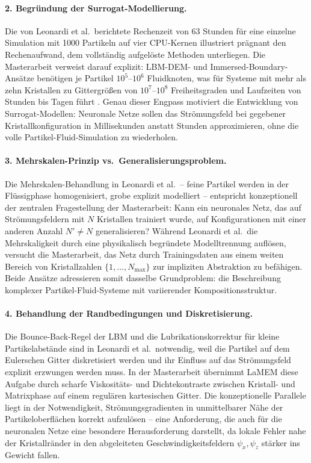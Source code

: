 \documentclass[a4paper,12pt]{article}
\begin{document}
\paragraph{2. Begründung der Surrogat-Modellierung.}
Die von Leonardi et al.\ berichtete Rechenzeit von 63 Stunden für eine
einzelne Simulation mit 1000 Partikeln auf vier CPU-Kernen illustriert
prägnant den Rechenaufwand, dem vollständig aufgelöste Methoden
unterliegen. Die Masterarbeit verweist darauf explizit: LBM-DEM- und
Immersed-Boundary-Ansätze benötigen je Partikel $10^5$--$10^6$ Fluidknoten,
was für Systeme mit mehr als zehn Kristallen zu Gittergrößen von $10^7$--$10^8$
Freiheitsgraden und Laufzeiten von Stunden bis Tagen führt
\cite{leonardi_coupled_2014}. Genau dieser Engpass motiviert die Entwicklung
von Surrogat-Modellen: Neuronale Netze sollen das Strömungsfeld bei
gegebener Kristallkonfiguration in Millisekunden anstatt Stunden
approximieren, ohne die volle Partikel-Fluid-Simulation zu wiederholen.

\paragraph{3. Mehrskalen-Prinzip vs.\ Generalisierungsproblem.}
Die Mehrskalen-Behandlung in Leonardi et al.\ -- feine Partikel werden in
der Flüssigphase homogenisiert, grobe explizit modelliert -- entspricht
konzeptionell der zentralen Fragestellung der Masterarbeit: Kann ein neuronales
Netz, das auf Strömungsfeldern mit $N$ Kristallen trainiert wurde, auf
Konfigurationen mit einer anderen Anzahl $N' \neq N$ generalisieren? Während
Leonardi et al.\ die Mehrskaligkeit durch eine physikalisch begründete
Modelltrennung auflösen, versucht die Masterarbeit, das Netz durch
Trainingsdaten aus einem weiten Bereich von Kristallzahlen
$\{1, \ldots, N_\mathrm{max}\}$ zur impliziten Abstraktion zu befähigen.
Beide Ansätze adressieren somit dasselbe Grundproblem: die Beschreibung
komplexer Partikel-Fluid-Systeme mit variierender Kompositionsstruktur.

\paragraph{4. Behandlung der Randbedingungen und Diskretisierung.}
Die Bounce-Back-Regel der LBM und die Lubrikationskorrektur für kleine
Partikelabstände sind in Leonardi et al.\ notwendig, weil die Partikel
auf dem Eulerschen Gitter diskretisiert werden und ihr Einfluss auf das
Strömungsfeld explizit erzwungen werden muss. In der Masterarbeit übernimmt
LaMEM diese Aufgabe durch scharfe Viskositäts- und Dichtekontraste zwischen
Kristall- und Matrixphase auf einem regulären kartesischen Gitter. Die
konzeptionelle Parallele liegt in der Notwendigkeit, Strömungsgradienten in
unmittelbarer Nähe der Partikeloberflächen korrekt aufzulösen -- eine
Anforderung, die auch für die neuronalen Netze eine besondere Herausforderung
darstellt, da lokale Fehler nahe der Kristallränder in den abgeleiteten
Geschwindigkeitsfeldern $\psi_x, \psi_z$ stärker ins Gewicht fallen.
\end{document}
